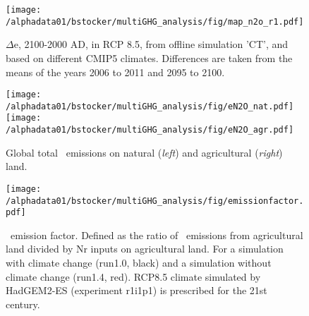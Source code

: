 \documentclass{myreport}
\begin{document}
\begin{figure}[ht!]
\begin{center}
  \texttt{[image: /alphadata01/bstocker/multiGHG\_analysis/fig/map\_n2o\_r1.pdf]}
\end{center}
\caption{$\Delta$e\nno [gN$_2$O-N/m$^2$/yr], 2100-2000 AD, in RCP 8.5, from offline simulation 'CT', and based on different CMIP5 climates. Differences are taken from the means of the years 2006 to 2011 and 2095 to 2100.}
\label{fig:mapN2O}
\end{figure}

\begin{figure}[ht!]
\begin{center}
\texttt{[image: /alphadata01/bstocker/multiGHG\_analysis/fig/eN2O\_nat.pdf]}
\texttt{[image: /alphadata01/bstocker/multiGHG\_analysis/fig/eN2O\_agr.pdf]}
\end{center}
\caption{Global total \nno\ emissions on natural ({\sl left}) and agricultural ({\sl right}) land.}
\label{fig:eN2Oagrnat}
\end{figure}



\begin{figure}[ht!]
\begin{center}
\texttt{[image: /alphadata01/bstocker/multiGHG\_analysis/fig/emissionfactor.pdf]}
\end{center}
\caption{\nno\ emission factor. Defined as the ratio of \nno\ emissions from agricultural land divided by Nr inputs on agricultural land. For a simulation with climate change (run1.0, black) and a simulation without climate change (run1.4, red). RCP8.5 climate simulated by HadGEM2-ES (experiment r1i1p1) is prescribed for the 21st century.}
\label{fig:emissionfactor}
\end{figure}

\end{document}
